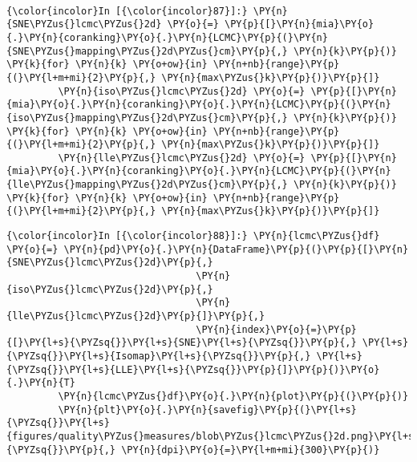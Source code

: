     \begin{center}
    \end{center}
    { \hspace*{\fill} \\}

    \begin{Verbatim}[commandchars=\\\{\}]
{\color{incolor}In [{\color{incolor}87}]:} \PY{n}{SNE\PYZus{}lcmc\PYZus{}2d} \PY{o}{=} \PY{p}{[}\PY{n}{mia}\PY{o}{.}\PY{n}{coranking}\PY{o}{.}\PY{n}{LCMC}\PY{p}{(}\PY{n}{SNE\PYZus{}mapping\PYZus{}2d\PYZus{}cm}\PY{p}{,} \PY{n}{k}\PY{p}{)} \PY{k}{for} \PY{n}{k} \PY{o+ow}{in} \PY{n+nb}{range}\PY{p}{(}\PY{l+m+mi}{2}\PY{p}{,} \PY{n}{max\PYZus{}k}\PY{p}{)}\PY{p}{]}
         \PY{n}{iso\PYZus{}lcmc\PYZus{}2d} \PY{o}{=} \PY{p}{[}\PY{n}{mia}\PY{o}{.}\PY{n}{coranking}\PY{o}{.}\PY{n}{LCMC}\PY{p}{(}\PY{n}{iso\PYZus{}mapping\PYZus{}2d\PYZus{}cm}\PY{p}{,} \PY{n}{k}\PY{p}{)} \PY{k}{for} \PY{n}{k} \PY{o+ow}{in} \PY{n+nb}{range}\PY{p}{(}\PY{l+m+mi}{2}\PY{p}{,} \PY{n}{max\PYZus{}k}\PY{p}{)}\PY{p}{]}
         \PY{n}{lle\PYZus{}lcmc\PYZus{}2d} \PY{o}{=} \PY{p}{[}\PY{n}{mia}\PY{o}{.}\PY{n}{coranking}\PY{o}{.}\PY{n}{LCMC}\PY{p}{(}\PY{n}{lle\PYZus{}mapping\PYZus{}2d\PYZus{}cm}\PY{p}{,} \PY{n}{k}\PY{p}{)} \PY{k}{for} \PY{n}{k} \PY{o+ow}{in} \PY{n+nb}{range}\PY{p}{(}\PY{l+m+mi}{2}\PY{p}{,} \PY{n}{max\PYZus{}k}\PY{p}{)}\PY{p}{]}
\end{Verbatim}

    \begin{Verbatim}[commandchars=\\\{\}]
{\color{incolor}In [{\color{incolor}88}]:} \PY{n}{lcmc\PYZus{}df} \PY{o}{=} \PY{n}{pd}\PY{o}{.}\PY{n}{DataFrame}\PY{p}{(}\PY{p}{[}\PY{n}{SNE\PYZus{}lcmc\PYZus{}2d}\PY{p}{,}
                                 \PY{n}{iso\PYZus{}lcmc\PYZus{}2d}\PY{p}{,}
                                 \PY{n}{lle\PYZus{}lcmc\PYZus{}2d}\PY{p}{]}\PY{p}{,}
                                 \PY{n}{index}\PY{o}{=}\PY{p}{[}\PY{l+s}{\PYZsq{}}\PY{l+s}{SNE}\PY{l+s}{\PYZsq{}}\PY{p}{,} \PY{l+s}{\PYZsq{}}\PY{l+s}{Isomap}\PY{l+s}{\PYZsq{}}\PY{p}{,} \PY{l+s}{\PYZsq{}}\PY{l+s}{LLE}\PY{l+s}{\PYZsq{}}\PY{p}{]}\PY{p}{)}\PY{o}{.}\PY{n}{T}
         \PY{n}{lcmc\PYZus{}df}\PY{o}{.}\PY{n}{plot}\PY{p}{(}\PY{p}{)}
         \PY{n}{plt}\PY{o}{.}\PY{n}{savefig}\PY{p}{(}\PY{l+s}{\PYZsq{}}\PY{l+s}{figures/quality\PYZus{}measures/blob\PYZus{}lcmc\PYZus{}2d.png}\PY{l+s}{\PYZsq{}}\PY{p}{,} \PY{n}{dpi}\PY{o}{=}\PY{l+m+mi}{300}\PY{p}{)}
\end{Verbatim}

